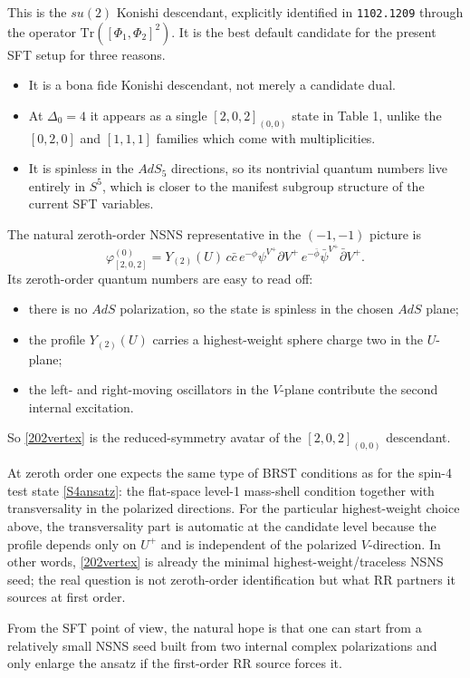 \documentclass[12pt]{article}
\def\be{\begin{equation}}
\def\ee{\end{equation}}
\newcommand{\D}{\ensuremath{\Delta}}
\newcommand{\Tr}{\mathrm{Tr}}
\begin{document}
This is the $su(2)$ Konishi descendant, explicitly identified in \texttt{1102.1209} through the operator
$\Tr([\Phi_1,\Phi_2]^2)$.
It is the best default candidate for the present SFT setup for three reasons.
\begin{itemize}
\item It is a bona fide Konishi descendant, not merely a candidate dual.
\item At $\D_0=4$ it appears as a single $[2,0,2]_{(0,0)}$ state in Table 1, unlike the
$[0,2,0]$ and $[1,1,1]$ families which come with multiplicities.
\item It is spinless in the $AdS_5$ directions, so its nontrivial quantum numbers live entirely in
$S^5$, which is closer to the manifest subgroup structure of the current SFT variables.
\end{itemize}

The natural zeroth-order NSNS representative in the $(-1,-1)$ picture is
\be
\varphi^{(0)}_{[2,0,2]}
=Y_{(2)}(U)\, c\bar c\,
e^{-\phi}\psi^{V^+}\partial V^+\,
e^{-\bar\phi}\bar\psi^{V^+}\bar\partial V^+.
\label{202vertex}
\ee
Its zeroth-order quantum numbers are easy to read off:
\begin{itemize}
\item there is no $AdS$ polarization, so the state is spinless in the chosen $AdS$ plane;
\item the profile $Y_{(2)}(U)$ carries a highest-weight sphere charge two in the $U$-plane;
\item the left- and right-moving oscillators in the $V$-plane contribute the second internal excitation.
\end{itemize}
So \eqref{202vertex} is the reduced-symmetry avatar of the $[2,0,2]_{(0,0)}$ descendant.

At zeroth order one expects the same type of BRST conditions as for the spin-4 test state
\eqref{S4ansatz}: the flat-space level-1 mass-shell condition together with transversality in the
polarized directions. For the particular highest-weight choice above, the transversality part is automatic
at the candidate level because the profile depends only on $U^+$ and is independent of the polarized
$V$-direction. In other words, \eqref{202vertex} is already the minimal highest-weight/traceless NSNS seed;
the real question is not zeroth-order identification but what RR partners it sources at first order.

From the SFT point of view, the natural hope is that one can start from a relatively small NSNS seed
built from two internal complex polarizations and only enlarge the ansatz if the first-order RR source
forces it.
\end{document}
